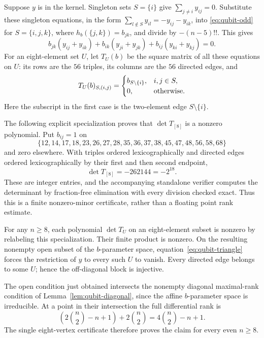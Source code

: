 \documentclass[11pt]{article}
\theoremstyle{remark}\newtheorem{remark}[theorem]{Remark}
\begin{document}
Suppose $y$ is in the kernel. Singleton sets $S=\{i\}$ give
$\sum_{j\ne i}y_{ij}=0$. Substitute these singleton equations, in the
form $\sum_{l\notin S}y_{il}=-y_{ij}-y_{ik}$, into
\eqref{eq:qubit-odd} for $S=\{i,j,k\}$, where $h_b(\{j,k\})=b_{jk}$,
and divide by $-(n-5)!!$. This gives
\begin{equation}\label{eq:qubit-triangle}
 b_{jk}(y_{ij}+y_{ik})+
 b_{ik}(y_{ji}+y_{jk})+
 b_{ij}(y_{ki}+y_{kj})=0.
\end{equation}
For an eight-element set $U$, let $T_U(b)$ be the square matrix of all
these equations on $U$: its rows are the $56$ triples, its columns are
the $56$ directed edges, and
\[
 T_U(b)_{S,(i,j)}=
 \begin{cases}
 b_{S\setminus\{i\}},&i,j\in S,\\
 0,&\textnormal{otherwise}.
 \end{cases}
\]
Here the subscript in the first case is the two-element edge
$S\setminus\{i\}$.

The following explicit specialization proves that $\det T_{[8]}$ is a
nonzero polynomial. Put $b_{ij}=1$ on
\begin{equation}\label{eq:qubit-eight-edges}
 \{12,14,17,18,23,26,27,28,35,36,37,38,45,47,48,56,58,68\}
\end{equation}
and zero elsewhere. With triples ordered lexicographically and directed
edges ordered lexicographically by their first and then second endpoint,
\begin{equation}\label{eq:qubit-eight-det}
 \det T_{[8]}=-262144=-2^{18}.
\end{equation}
These are integer entries, and the accompanying standalone verifier
computes the determinant by fraction-free elimination with every division
checked exact. Thus this is a finite nonzero-minor certificate, rather
than a floating point rank estimate.

For any $n\geq8$, each polynomial $\det T_U$ on an eight-element subset
is nonzero by relabeling this specialization. Their finite product is
nonzero. On the resulting nonempty open subset of the $b$-parameter
space, equation~\eqref{eq:qubit-triangle} forces the restriction of $y$
to every such $U$ to vanish. Every directed edge belongs to some $U$;
hence the off-diagonal block is injective.

The open condition just obtained intersects the nonempty diagonal
maximal-rank condition of Lemma~\ref{lem:qubit-diagonal}, since the
affine $b$-parameter space is irreducible. At a point in their
intersection the full differential rank is
\[
 \left(2\binom n2-n+1\right)+2\binom n2
 =4\binom n2-n+1.
\]
The single eight-vertex certificate therefore proves the claim for
every even $n\geq8$.
\end{document}
